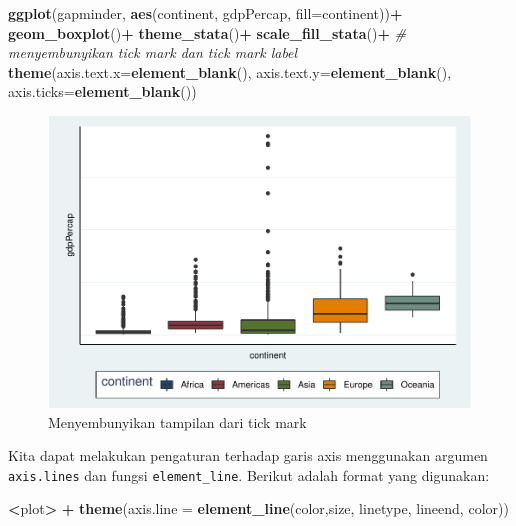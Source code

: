 \documentclass[]{book}
\newenvironment{Shaded}{\begin{snugshade}}{\end{snugshade}}
\newcommand{\KeywordTok}[1]{\textcolor[rgb]{0.13,0.29,0.53}{\textbf{#1}}}
\newcommand{\DataTypeTok}[1]{\textcolor[rgb]{0.13,0.29,0.53}{#1}}
\newcommand{\StringTok}[1]{\textcolor[rgb]{0.31,0.60,0.02}{#1}}
\newcommand{\CommentTok}[1]{\textcolor[rgb]{0.56,0.35,0.01}{\textit{#1}}}
\newcommand{\OperatorTok}[1]{\textcolor[rgb]{0.81,0.36,0.00}{\textbf{#1}}}
\newcommand{\NormalTok}[1]{#1}
\begin{document}
\begin{Shaded}
\begin{Highlighting}[]
\KeywordTok{ggplot}\NormalTok{(gapminder, }\KeywordTok{aes}\NormalTok{(continent, gdpPercap,}
                      \DataTypeTok{fill=}\NormalTok{continent))}\OperatorTok{+}
\StringTok{  }\KeywordTok{geom_boxplot}\NormalTok{()}\OperatorTok{+}
\StringTok{  }\KeywordTok{theme_stata}\NormalTok{()}\OperatorTok{+}
\StringTok{  }\KeywordTok{scale_fill_stata}\NormalTok{()}\OperatorTok{+}
\StringTok{  }\CommentTok{# menyembunyikan tick mark dan tick mark label}
\StringTok{  }\KeywordTok{theme}\NormalTok{(}\DataTypeTok{axis.text.x=}\KeywordTok{element_blank}\NormalTok{(),}
  \DataTypeTok{axis.text.y=}\KeywordTok{element_blank}\NormalTok{(),}
  \DataTypeTok{axis.ticks=}\KeywordTok{element_blank}\NormalTok{())}
\end{Highlighting}
\end{Shaded}

\begin{figure}

{\centering \includegraphics[width=0.7\linewidth]{EnvStat_files/figure-latex/ggtick2-1} 

}

\caption{Menyembunyikan tampilan dari tick mark}\label{fig:ggtick2}
\end{figure}

Kita dapat melakukan pengaturan terhadap garis axis menggunakan argumen
\texttt{axis.lines} dan fungsi \texttt{element\_line}. Berikut adalah
format yang digunakan:

\begin{Shaded}
\begin{Highlighting}[]
\OperatorTok{<}\NormalTok{plot}\OperatorTok{>}\StringTok{ }\OperatorTok{+}\StringTok{ }\KeywordTok{theme}\NormalTok{(}\DataTypeTok{axis.line =} \KeywordTok{element_line}\NormalTok{(color,size, linetype,}
\NormalTok{                                        lineend, color))}
\end{Highlighting}
\end{Shaded}
\end{document}
